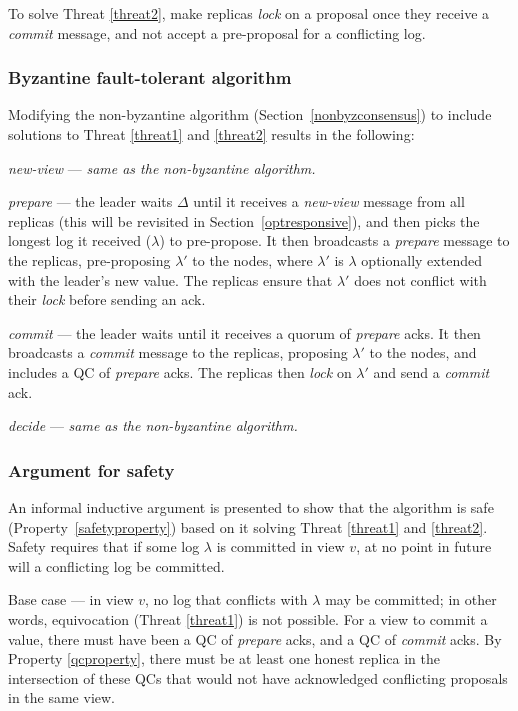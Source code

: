 To solve Threat \ref{threat2}, make replicas \textit{lock} on a proposal once they receive a \textit{commit} message, and not accept a pre-proposal for a conflicting log.

\subsubsection{Byzantine fault-tolerant algorithm}
Modifying the non-byzantine algorithm (Section~\ref{nonbyzconsensus}) to include solutions to Threat \ref{threat1} and \ref{threat2} results in the following:

\begin{description}
	\item \textit{new-view} --- \textit{same as the non-byzantine algorithm.}
	\item \textit{prepare} --- the leader waits $\Delta$ until it receives a \textit{new-view} message from all replicas (this will be revisited in Section~\ref{optresponsive}), and then picks the longest log it received ($\lambda$) to pre-propose. It then broadcasts a \textit{prepare} message to the replicas, pre-proposing $\lambda'$ to the nodes, where $\lambda'$ is $\lambda$ optionally extended with the leader's new value. The replicas ensure that $\lambda'$ does not conflict with their \textit{lock} before sending an ack.
	\item \textit{commit} --- the leader waits until it receives a quorum of \textit{prepare} acks. It then broadcasts a \textit{commit} message to the replicas, proposing $\lambda'$ to the nodes, and includes a QC of \textit{prepare} acks. The replicas then \textit{lock} on $\lambda'$ and send a \textit{commit} ack.
	\item \textit{decide} --- \textit{same as the non-byzantine algorithm.}
\end{description}

\subsubsection{Argument for safety} \label{safetyargument}
An informal inductive argument is presented to show that the algorithm is safe (Property~\ref{safetyproperty}) based on it solving Threat \ref{threat1} and \ref{threat2}. Safety requires that if some log $\lambda$ is committed in view $v$, at no point in future will a conflicting log be committed.

Base case --- in view $v$, no log that conflicts with $\lambda$ may be committed; in other words, equivocation (Threat \ref{threat1}) is not possible. For a view to commit a value, there must have been a QC of \textit{prepare} acks, and a QC of \textit{commit} acks. By Property \ref{qcproperty}, there must be at least one honest replica in the intersection of these QCs that would not have acknowledged conflicting proposals in the same view.

